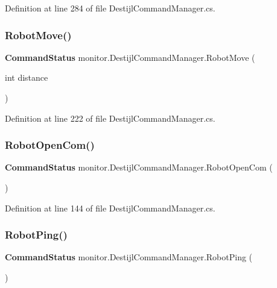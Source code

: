 Definition at line 284 of file Destijl\+Command\+Manager.\+cs.

\mbox{\label{classmonitor_1_1_destijl_command_manager_a5976fe792e270c63bd9f0f4c792df129}} 
\subsubsection{Robot\+Move()}
{\footnotesize\ttfamily \textbf{ Command\+Status} monitor.\+Destijl\+Command\+Manager.\+Robot\+Move (\begin{DoxyParamCaption}\item[{int}]{distance }\end{DoxyParamCaption})}



Definition at line 222 of file Destijl\+Command\+Manager.\+cs.

\mbox{\label{classmonitor_1_1_destijl_command_manager_aa1440a571e6aaf11203b4e4a4ed116d5}} 
\subsubsection{Robot\+Open\+Com()}
{\footnotesize\ttfamily \textbf{ Command\+Status} monitor.\+Destijl\+Command\+Manager.\+Robot\+Open\+Com (\begin{DoxyParamCaption}{ }\end{DoxyParamCaption})}



Definition at line 144 of file Destijl\+Command\+Manager.\+cs.

\mbox{\label{classmonitor_1_1_destijl_command_manager_ae1af16558213c3830ea3006e8e8c5e28}} 
\subsubsection{Robot\+Ping()}
{\footnotesize\ttfamily \textbf{ Command\+Status} monitor.\+Destijl\+Command\+Manager.\+Robot\+Ping (\begin{DoxyParamCaption}{ }\end{DoxyParamCaption})}



